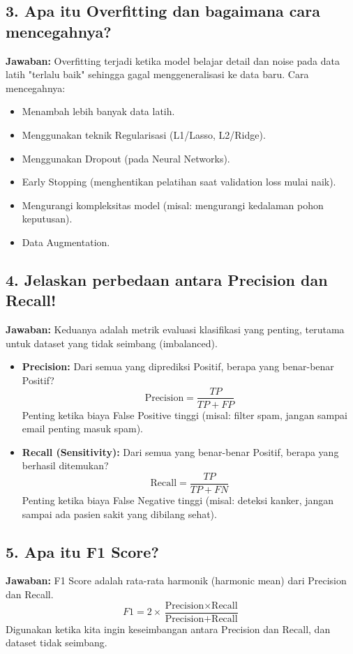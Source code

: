 \subsection{3. Apa itu Overfitting dan bagaimana cara mencegahnya?}
\textbf{Jawaban:}
Overfitting terjadi ketika model belajar detail dan noise pada data latih "terlalu baik" sehingga gagal menggeneralisasi ke data baru.
Cara mencegahnya:
\begin{itemize}
    \item Menambah lebih banyak data latih.
    \item Menggunakan teknik Regularisasi (L1/Lasso, L2/Ridge).
    \item Menggunakan Dropout (pada Neural Networks).
    \item Early Stopping (menghentikan pelatihan saat validation loss mulai naik).
    \item Mengurangi kompleksitas model (misal: mengurangi kedalaman pohon keputusan).
    \item Data Augmentation.
\end{itemize}

\subsection{4. Jelaskan perbedaan antara Precision dan Recall!}
\textbf{Jawaban:}
Keduanya adalah metrik evaluasi klasifikasi yang penting, terutama untuk dataset yang tidak seimbang (imbalanced).
\begin{itemize}
    \item \textbf{Precision:} Dari semua yang diprediksi Positif, berapa yang benar-benar Positif?
    \[ \text{Precision} = \frac{TP}{TP + FP} \]
    Penting ketika biaya False Positive tinggi (misal: filter spam, jangan sampai email penting masuk spam).
    \item \textbf{Recall (Sensitivity):} Dari semua yang benar-benar Positif, berapa yang berhasil ditemukan?
    \[ \text{Recall} = \frac{TP}{TP + FN} \]
    Penting ketika biaya False Negative tinggi (misal: deteksi kanker, jangan sampai ada pasien sakit yang dibilang sehat).
\end{itemize}

\subsection{5. Apa itu F1 Score?}
\textbf{Jawaban:}
F1 Score adalah rata-rata harmonik (harmonic mean) dari Precision dan Recall.
\[ F1 = 2 \times \frac{\text{Precision} \times \text{Recall}}{\text{Precision} + \text{Recall}} \]
Digunakan ketika kita ingin keseimbangan antara Precision dan Recall, dan dataset tidak seimbang.

